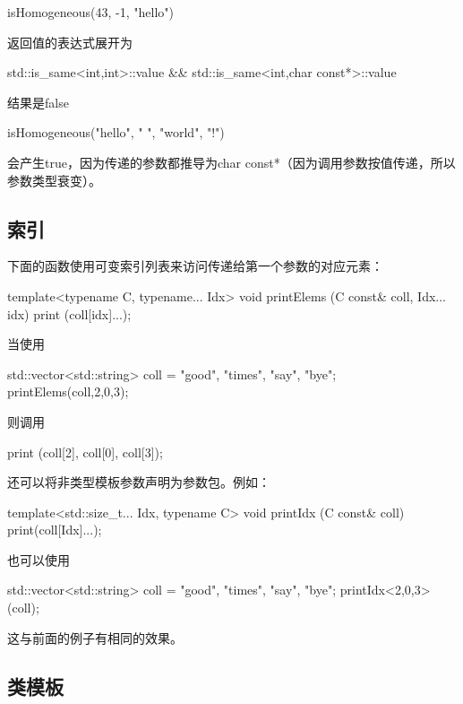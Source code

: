 \begin{cpp}
isHomogeneous(43, -1, "hello")
\end{cpp}

返回值的表达式展开为

\begin{cpp}
std::is_same<int,int>::value && std::is_same<int,char const*>::value
\end{cpp}

结果是false

\begin{cpp}
isHomogeneous("hello", " ", "world", "!")
\end{cpp}

会产生true，因为传递的参数都推导为char const*（因为调用参数按值传递，所以参数类型衰变）。

\subsection{索引}

下面的函数使用可变索引列表来访问传递给第一个参数的对应元素：

\begin{cpp}
template<typename C, typename... Idx>
void printElems (C const& coll, Idx... idx)
{
	print (coll[idx]...);
}
\end{cpp}

当使用

\begin{cpp}
std::vector<std::string> coll = {"good", "times", "say", "bye"};
printElems(coll,2,0,3);
\end{cpp}

则调用

\begin{shell}
print (coll[2], coll[0], coll[3]);
\end{shell}

还可以将非类型模板参数声明为参数包。例如：

\begin{cpp}
template<std::size_t... Idx, typename C>
void printIdx (C const& coll)
{
	print(coll[Idx]...);
}
\end{cpp}

也可以使用

\begin{cpp}
std::vector<std::string> coll = {"good", "times", "say", "bye"};
printIdx<2,0,3>(coll);
\end{cpp}

这与前面的例子有相同的效果。

\subsection{类模板}

